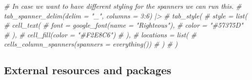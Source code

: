 \documentclass[
]{article}
\newenvironment{Shaded}{\begin{snugshade}}{\end{snugshade}}
\newcommand{\CommentTok}[1]{\textcolor[rgb]{0.56,0.35,0.01}{\textit{#1}}}
\begin{document}
\begin{Shaded}
\begin{Highlighting}[]
  \CommentTok{\# In case we want to have different styling for the spanners we can run this.}
  \CommentTok{\# tab\_spanner\_delim(delim = "\_", columns = 3:6) |\textgreater{} }
  \CommentTok{\# tab\_style(}
  \CommentTok{\#   style = list(}
  \CommentTok{\#     cell\_text(}
  \CommentTok{\#       font = google\_font(name = "Righteous"),}
  \CommentTok{\#       color = "\#57375D"}
  \CommentTok{\#     ),}
  \CommentTok{\#     cell\_fill(color = "\#F2E8C6")}
  \CommentTok{\#     ),}
  \CommentTok{\#   locations = list(}
  \CommentTok{\#     cells\_column\_spanners(spanners = everything())}
  \CommentTok{\#     )}
  \CommentTok{\#   ) }
\end{Highlighting}
\end{Shaded}

\hypertarget{external-resources-and-packages}{%
\subsection{External resources and
packages}\label{external-resources-and-packages}}
\end{document}
